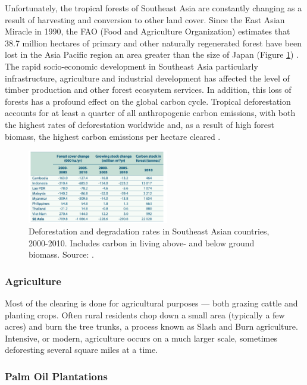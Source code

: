 Unfortunately, the tropical forests of Southeast Asia are constantly changing as a result of harvesting and conversion to other land cover. Since the East Asian Miracle in 1990, the FAO (Food and Agriculture Organization) estimates that 38.7 million hectares of primary and other naturally regenerated forest have been lost in the Asia Pacific region an area greater than the size of Japan (Figure \ref{fig:deforestation}) \citep{faoun163agriculture}. The rapid socio-economic development in Southeast Asia particularly infrastructure, agriculture and industrial development has affected the level of timber production and other forest ecosystem services. In addition, this loss of forests has a profound effect on the global carbon cycle. Tropical deforestation accounts for at least a quarter of all anthropogenic carbon emissions, with both the highest rates of deforestation worldwide and, as a result of high forest biomass, the highest carbon emissions per hectare cleared \citep{corlett2014ecology}.

    \begin{figure}[ht]
    \centering
        \includegraphics[width = 0.55\textwidth]{graphics/carbonstock.png}
        \caption{Deforestation and degradation rates in Southeast Asian countries, 2000-2010. Includes carbon in living above- and below ground biomass. Source: \citep{faoun163agriculture}.}
				\label{fig:deforestation}
    \end{figure}

\subsubsection{Agriculture}

Most of the clearing is done for agricultural purposes --- both grazing cattle and planting crops. Often rural residents chop down a small area (typically a few acres) and burn the tree trunks, a process known as Slash and Burn agriculture. Intensive, or modern, agriculture occurs on a much larger scale, sometimes deforesting several square miles at a time.

\subsubsection{Palm Oil Plantations}

